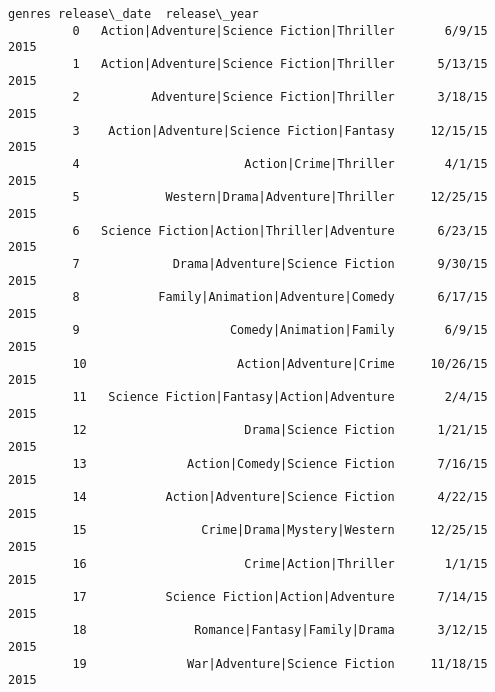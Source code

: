 \documentclass[11pt]{article}
\begin{document}
\begin{Verbatim}[commandchars=\\\{\}]
                                                genres release\_date  release\_year  
         0   Action|Adventure|Science Fiction|Thriller       6/9/15          2015  
         1   Action|Adventure|Science Fiction|Thriller      5/13/15          2015  
         2          Adventure|Science Fiction|Thriller      3/18/15          2015  
         3    Action|Adventure|Science Fiction|Fantasy     12/15/15          2015  
         4                       Action|Crime|Thriller       4/1/15          2015  
         5            Western|Drama|Adventure|Thriller     12/25/15          2015  
         6   Science Fiction|Action|Thriller|Adventure      6/23/15          2015  
         7             Drama|Adventure|Science Fiction      9/30/15          2015  
         8           Family|Animation|Adventure|Comedy      6/17/15          2015  
         9                     Comedy|Animation|Family       6/9/15          2015  
         10                     Action|Adventure|Crime     10/26/15          2015  
         11   Science Fiction|Fantasy|Action|Adventure       2/4/15          2015  
         12                      Drama|Science Fiction      1/21/15          2015  
         13              Action|Comedy|Science Fiction      7/16/15          2015  
         14           Action|Adventure|Science Fiction      4/22/15          2015  
         15                Crime|Drama|Mystery|Western     12/25/15          2015  
         16                      Crime|Action|Thriller       1/1/15          2015  
         17           Science Fiction|Action|Adventure      7/14/15          2015  
         18               Romance|Fantasy|Family|Drama      3/12/15          2015  
         19              War|Adventure|Science Fiction     11/18/15          2015  
\end{Verbatim}
            
\end{document}
